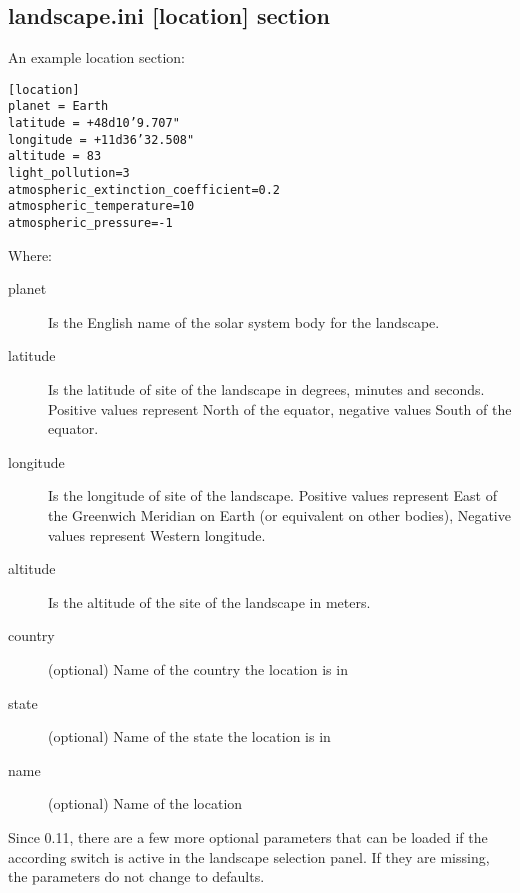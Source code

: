 \subsection{landscape.ini {[}location{]} section}\label{landscape.ini-location-section}

An example location section:

\begin{config}
\texttt{{[}location{]}}\\
\texttt{planet~=~Earth}\\
\texttt{latitude~=~+48d10'9.707"}\\
\texttt{longitude~=~+11d36'32.508"}\\
\texttt{altitude~=~83}\\
\texttt{light\_pollution=3}\\
\texttt{atmospheric\_extinction\_coefficient=0.2}\\
\texttt{atmospheric\_temperature=10}\\
\texttt{atmospheric\_pressure=-1}
\end{config}

Where:

\begin{description}
\item[planet] Is the English name of the solar system body for the
  landscape.
\item[latitude] Is the latitude of site of the landscape in degrees,
  minutes and seconds. Positive values represent North of the equator,
  negative values South of the equator.
\item[longitude] Is the longitude of site of the landscape. Positive
  values represent East of the Greenwich Meridian on Earth (or
  equivalent on other bodies), Negative values represent Western
  longitude.
\item[altitude] Is the altitude of the site of the landscape in
  meters.
\item[country] (optional) Name of the country the location is in
\item[state] (optional) Name of the state the location is in
\item[name] (optional) Name of the location
\end{description}

Since 0.11, there are a few more optional parameters that can be loaded
if the according switch is active in the landscape selection panel. If
they are missing, the parameters do not change to defaults.


